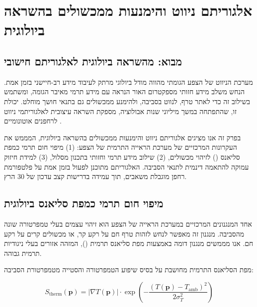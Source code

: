 
\section{אלגוריתם ניווט והימנעות ממכשולים בהשראה ביולוגית}
\label{sec:ch06_algorithm}

\subsection{מבוא: מהשראה ביולוגית לאלגוריתם חישובי}
\label{sec:ch06_intro}

מערכת הניווט של הצפע הגומתי מהווה מודל ביולוגי מרתק לעיבוד מידע רב-חיישני בזמן אמת. הנחש משלב מידע חזותי מספקטרום האור הנראה עם מידע תרמי מאיבר הגומה, ומשתמש בשילוב זה כדי לאתר טרף, לנווט בסביבה, ולהימנע ממכשולים גם בתנאי חושך מוחלט. יכולת זו, שהתפתחה במשך מיליוני שנות אבולוציה, מספקת השראה עיצובית לאלגוריתמי ניווט לרחפנים אוטונומיים \cite{Simmons1979BatSonar, MossEcholocation}.

בפרק זה אנו מציגים אלגוריתם ניווט והימנעות ממכשולים בהשראה ביולוגית, המממש את העקרונות המרכזיים של מערכת הראייה התרמית של הצפע: (1) מיפוי חום תרמי כמפת סליאנס () לזיהוי מכשולים, (2) שילוב מידע תרמי וחזותי בתכנון מסלול, (3) למידת חיזוק עמוקה להתאמה דינמית לתנאי הסביבה. האלגוריתם מתוכנן לפעול בזמן אמת על פלטפורמת רחפן מוגבלת משאבים, תוך עמידה בדרישות קצב עדכון של 30 הרץ.

\subsection{מיפוי חום תרמי כמפת סליאנס ביולוגית}
\label{sec:ch06_thermal_saliency}

אחד המנגנונים המרכזיים במערכת הראייה של הצפע הוא זיהוי עצמים בעלי טמפרטורה שונה מהסביבה. מנגנון זה מאפשר לנחש לזהות טרף חם על רקע קר, או מכשולים קרים על רקע חם. אנו מממשים מנגנון דומה באמצעות מפת סליאנס תרמית (), המזהה אזורים בעלי ניגודיות תרמית גבוהה.

מפת הסליאנס התרמית מחושבת על בסיס שיפוע הטמפרטורה והסטייה מטמפרטורת הסביבה:

\begin{equation}
S_{\text{therm}}(\mathbf{p}) = \left| \nabla T(\mathbf{p}) \right| \cdot \exp\left( -\frac{(T(\mathbf{p}) - T_{\text{amb}})^2}{2\sigma_T^2} \right)
\label{eq:ch06_thermal_saliency}
\end{equation}

